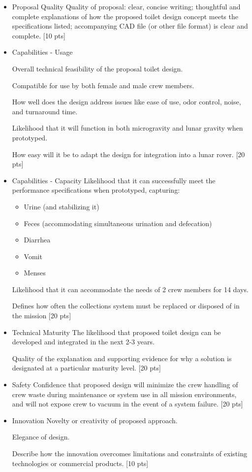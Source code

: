 \begin{itemize}
    \item  Proposal Quality
    Quality of proposal: clear, concise writing;  thoughtful and complete explanations of how the proposed toilet design concept meets the specifications listed; accompanying CAD file (or other file format) is clear and complete. [10 pts]

    \item Capabilities - Usage
    
    Overall technical feasibility of the proposal toilet design.

    Compatible for use by both female and male crew members.

    How well does the design address issues like ease of use, odor control, noise, and turnaround time.

    Likelihood that it will function in both microgravity and lunar gravity when prototyped.

    How easy will it be to adapt the design for integration into a lunar rover. [20 pts]

    \item Capabilities - Capacity
    Likelihood that it can successfully meet the performance specifications when prototyped, capturing:
    \begin{itemize}
        \item Urine (and stabilizing it)
        \item Feces (accommodating simultaneous urination and defecation)
        \item Diarrhea
        \item Vomit
        \item Menses
    \end{itemize}

    Likelihood that it can accommodate the needs of 2 crew members for 14 days.
        
    Defines how often the collections system must be replaced or disposed of in the mission [20 pts]

    \item Technical Maturity
    The likelihood that proposed toilet design can be developed and integrated in the next 2-3 years.

    Quality of the explanation and supporting evidence for why a solution is designated at a particular maturity level. [20 pts]

    \item Safety
    Confidence that proposed design will minimize the crew handling of crew waste during maintenance or system use in all mission environments, and will not expose crew to vacuum in the event of a system failure. [20 pts]

    \item Innovation
    Novelty or creativity of proposed approach.

    Elegance of design.
    
    Describe how the innovation overcomes limitations and constraints of existing technologies or commercial products. [10 pts]
\end{itemize}

